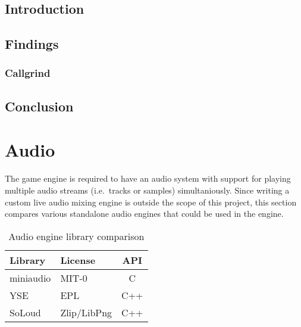 \documentclass{projdoc}
\begin{document}
\subsection{Introduction}

\subsection{Findings}

\subsubsection{Callgrind}

\begin{comparison}
\end{comparison}

\subsection{Conclusion}

\section{Audio}


The game engine is required to have an audio system with support for playing multiple
audio streams (i.e.~tracks or samples) simultaniously. Since writing a custom live
audio mixing engine is outside the scope of this project, this section compares
various standalone audio engines that could be used in the engine.


\begin{table}
	\centering
	\begin{tabular}{llc}
		\toprule
		\textbf{Library} & \textbf{License} & \textbf{API}\\
		\midrule
		miniaudio & MIT-0 & C\\
		YSE & EPL & C++\\
		SoLoud & Zlip/LibPng & C++\\
		\bottomrule
	\end{tabular}
	\caption{Audio engine library comparison}
	\label{tab:audio-engines}
\end{table}
\end{document}

